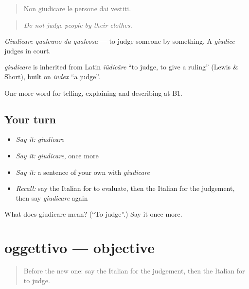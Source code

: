 \begin{quote}
Non giudicare le persone dai vestiti.
\end{quote}

\begin{quote}
\emph{Do not judge people by their clothes.}
\end{quote}

\emph{Giudicare qualcuno da qualcosa} — to judge someone by something. A \emph{giudice} judges in court.

\begin{cousinweb}
\emph{giudicare} is inherited from Latin \emph{iūdicāre} \textquotedblleft{}to judge, to give a ruling\textquotedblright{} (Lewis \& Short), built on \emph{iūdex} \textquotedblleft{}a judge\textquotedblright{}.
\end{cousinweb}

\begin{grammarlens}[title={What you've built}]
One more word for telling, explaining and describing at B1.
\end{grammarlens}

\subsection*{Your turn}
\begin{itemize}
\raggedright
  \item \emph{Say it:} \emph{giudicare}
  \item \emph{Say it:} \emph{giudicare}, once more
  \item \emph{Say it:} a sentence of your own with \emph{giudicare}
  \item \emph{Recall:} say the Italian for to evaluate, then the Italian for the judgement, then say \emph{giudicare} again
\end{itemize}

\begin{tcolorbox}[breakable,colback=teal!4,colframe=teal!35!black,title={Before you move on}]
What does giudicare mean? (\textquotedblleft{}To judge\textquotedblright{}.) Say it once more.
\end{tcolorbox}
\section[oggettivo]{oggettivo — objective}

\label{lesson:IT-C347-oggettivo}



\begin{quote}
Before the new one: say the Italian for the judgement, then the Italian for to judge.
\end{quote}

